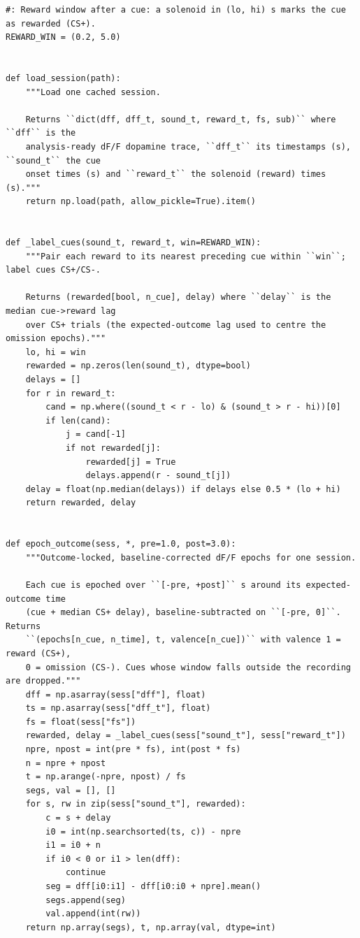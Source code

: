 \begin{lstlisting}[caption={mrl\_trace/dopamine.py},label={lst:siox-src-dopamine}]
#: Reward window after a cue: a solenoid in (lo, hi) s marks the cue as rewarded (CS+).
REWARD_WIN = (0.2, 5.0)


def load_session(path):
    """Load one cached session.

    Returns ``dict(dff, dff_t, sound_t, reward_t, fs, sub)`` where ``dff`` is the
    analysis-ready dF/F dopamine trace, ``dff_t`` its timestamps (s), ``sound_t`` the cue
    onset times (s) and ``reward_t`` the solenoid (reward) times (s)."""
    return np.load(path, allow_pickle=True).item()


def _label_cues(sound_t, reward_t, win=REWARD_WIN):
    """Pair each reward to its nearest preceding cue within ``win``; label cues CS+/CS-.

    Returns (rewarded[bool, n_cue], delay) where ``delay`` is the median cue->reward lag
    over CS+ trials (the expected-outcome lag used to centre the omission epochs)."""
    lo, hi = win
    rewarded = np.zeros(len(sound_t), dtype=bool)
    delays = []
    for r in reward_t:
        cand = np.where((sound_t < r - lo) & (sound_t > r - hi))[0]
        if len(cand):
            j = cand[-1]
            if not rewarded[j]:
                rewarded[j] = True
                delays.append(r - sound_t[j])
    delay = float(np.median(delays)) if delays else 0.5 * (lo + hi)
    return rewarded, delay


def epoch_outcome(sess, *, pre=1.0, post=3.0):
    """Outcome-locked, baseline-corrected dF/F epochs for one session.

    Each cue is epoched over ``[-pre, +post]`` s around its expected-outcome time
    (cue + median CS+ delay), baseline-subtracted on ``[-pre, 0]``. Returns
    ``(epochs[n_cue, n_time], t, valence[n_cue])`` with valence 1 = reward (CS+),
    0 = omission (CS-). Cues whose window falls outside the recording are dropped."""
    dff = np.asarray(sess["dff"], float)
    ts = np.asarray(sess["dff_t"], float)
    fs = float(sess["fs"])
    rewarded, delay = _label_cues(sess["sound_t"], sess["reward_t"])
    npre, npost = int(pre * fs), int(post * fs)
    n = npre + npost
    t = np.arange(-npre, npost) / fs
    segs, val = [], []
    for s, rw in zip(sess["sound_t"], rewarded):
        c = s + delay
        i0 = int(np.searchsorted(ts, c)) - npre
        i1 = i0 + n
        if i0 < 0 or i1 > len(dff):
            continue
        seg = dff[i0:i1] - dff[i0:i0 + npre].mean()
        segs.append(seg)
        val.append(int(rw))
    return np.array(segs), t, np.array(val, dtype=int)



\end{lstlisting}
